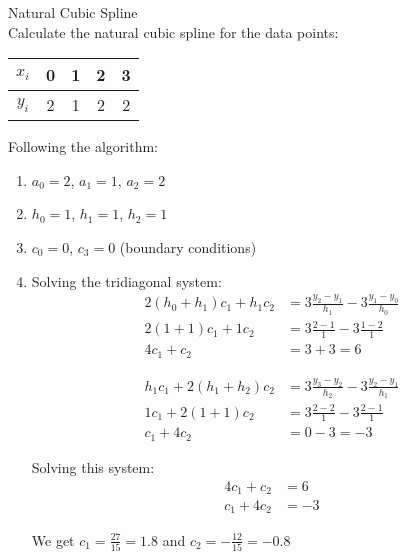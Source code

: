 \begin{example2}{Natural Cubic Spline}\\
Calculate the natural cubic spline for the data points:
\begin{center}
\begin{tabular}{c|cccc}
$x_i$ & 0 & 1 & 2 & 3 \\
\hline
$y_i$ & 2 & 1 & 2 & 2 \\
\end{tabular}
\end{center}

Following the algorithm:
\begin{enumerate}
    \item $a_0 = 2$, $a_1 = 1$, $a_2 = 2$
    \item $h_0 = 1$, $h_1 = 1$, $h_2 = 1$
    \item $c_0 = 0$, $c_3 = 0$ (boundary conditions)
    \item Solving the tridiagonal system:
    \begin{align*}
    2(h_0+h_1)c_1 + h_1c_2 &= 3\frac{y_2-y_1}{h_1} - 3\frac{y_1-y_0}{h_0}\\
    2(1+1)c_1 + 1c_2 &= 3\frac{2-1}{1} - 3\frac{1-2}{1}\\
    4c_1 + c_2 &= 3 + 3 = 6
    \end{align*}
    
    \begin{align*}
    h_1c_1 + 2(h_1+h_2)c_2 &= 3\frac{y_3-y_2}{h_2} - 3\frac{y_2-y_1}{h_1}\\
    1c_1 + 2(1+1)c_2 &= 3\frac{2-2}{1} - 3\frac{2-1}{1}\\
    c_1 + 4c_2 &= 0 - 3 = -3
    \end{align*}
    
    Solving this system:
    \begin{align*}
    4c_1 + c_2 &= 6\\
    c_1 + 4c_2 &= -3
    \end{align*}
    
    We get $c_1 = \frac{27}{15} = 1.8$ and $c_2 = -\frac{12}{15} = -0.8$
    

\end{enumerate}
\end{example2}
